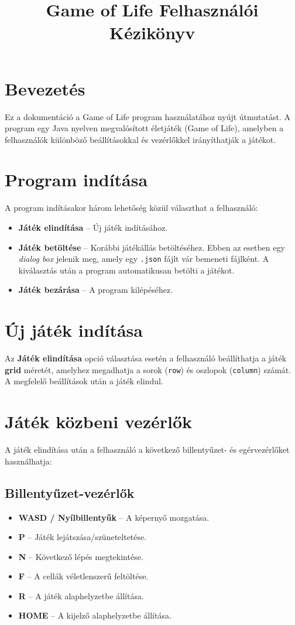 \documentclass[a4paper,12pt]{article}
\title{Game of Life Felhasználói Kézikönyv}
\author{}
\date{}
\begin{document}
\maketitle

\section*{Bevezetés}
Ez a dokumentáció a Game of Life program használatához nyújt útmutatást. A program egy Java nyelven megvalósított életjáték (Game of Life), amelyben a felhasználók különböző beállításokkal és vezérlőkkel irányíthatják a játékot.

\section*{Program indítása}
A program indításakor három lehetőség közül választhat a felhasználó:
\begin{itemize}
    \item \textbf{Játék elindítása} – Új játék indításához.
    \item \textbf{Játék betöltése} – Korábbi játékállás betöltéséhez. Ebben az esetben egy \textit{dialog box} jelenik meg, amely egy \texttt{.json} fájlt vár bemeneti fájlként. A kiválasztás után a program automatikusan betölti a játékot.
    \item \textbf{Játék bezárása} – A program kilépéséhez.
\end{itemize}

\section*{Új játék indítása}
Az \textbf{Játék elindítása} opció választása esetén a felhasználó beállíthatja a játék \textbf{grid} méretét, amelyhez megadhatja a sorok (\texttt{row}) és oszlopok (\texttt{column}) számát. A megfelelő beállítások után a játék elindul.

\newpage
\section*{Játék közbeni vezérlők}
A játék elindítása után a felhasználó a következő billentyűzet- és egérvezérlőket használhatja:

\subsection*{Billentyűzet-vezérlők}
\begin{itemize}
    \item \textbf{WASD / Nyílbillentyűk} – A képernyő mozgatása.
    \item \textbf{P} – Játék lejátszása/szüneteltetése.
    \item \textbf{N} – Következő lépés megtekintése.
    \item \textbf{F} – A cellák véletlenszerű feltöltése.
    \item \textbf{R} – A játék alaphelyzetbe állítása.
    \item \textbf{HOME} – A kijelző alaphelyzetbe állítása.
\end{itemize}
\end{document}
